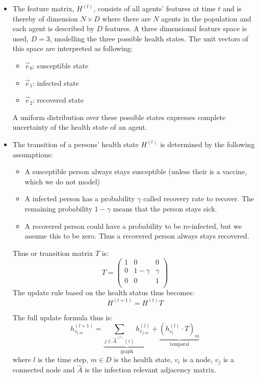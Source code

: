 \documentclass[]{article}
\begin{document}
\begin{itemize}
\begin{itemize}
	\end{itemize}
	\item The feature matrix, $H^{(t)}$, consists of all agents' features at time $t$ and is thereby of dimension $N\times D$ where there are $N$ agents in the population and each agent is described by $D$ features. A three dimensional feature space is used, $D=3$, modelling the three possible health states. The unit vectors of this space are interpreted as following:
	\begin{itemize}
		\item $\vec{e}_0$: susceptible state
		\item $\vec{e}_1$: infected state
		\item $\vec{e}_2$: recovered state
	\end{itemize}
	A uniform distribution over these possible states expresses complete uncertainty of the health state of an agent.
	\item The transition of a persons' health state $H^{(t)}$ is determined by the following assumptions:
	\begin{itemize}
		\item A susceptible person always stays susceptible (unless their is a vaccine, which we do not model)
		\item A infected person has a probability $\gamma$ called recovery rate to recover. The remaining probability $1-\gamma$ means that the person stays sick.
		\item A recovered person could have a probability to be re-infected, but we assume this to be zero. Thus a recovered person always stays recovered.
	\end{itemize}
	Thus or transition matrix $T$ is:
	\begin{equation}
		T = 
		\begin{pmatrix}
			1 &     0    & 0      \\
			0 & 1-\gamma & \gamma \\
			0 &     0    & 1      \\
		\end{pmatrix}
	\end{equation}
	The update rule based on the health status thus becomes:
	\begin{equation}
		H^{(t+1)} = H^{(t)} T
	\end{equation}

	The full update formula thus is:
	\begin{equation}
		h_{v_{i,m}}^{(l+1)}
		 = 
		\underbrace{
			\sum_{j \in \hat{A}^{(l)}(i)} h^{(l)}_{v_{j,m}}
		}_{\text{graph}} +
		\underbrace{
			(h^{(l)}_{v_{i}} \cdot T)_m 
		}_{\text{temporal}}
	\end{equation}
	where $l$ is the time step, $m \in D$ is the health state, $v_i$ is a node, $v_j$ is a connected node and $\hat{A}$ is the infection relevant adjacency matrix.
\end{itemize}
\end{document}
